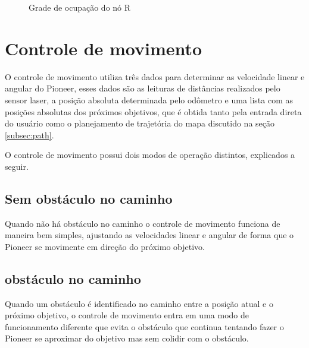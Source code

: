 \documentclass{llncs}
\begin{document}
\begin{figure}
	\centering
	\caption{Grade de ocupação do nó R}
	\label{fig:grade_no_R}
\end{figure}

\pagebreak
\section{Controle de movimento} \label{sec:movement}
O controle de movimento utiliza três dados para determinar as velocidade linear e angular do Pioneer, esses dados são as leituras de distâncias realizados pelo sensor laser, a posição absoluta determinada pelo odômetro e uma lista com as posições absolutas dos próximos objetivos, que é obtida tanto pela entrada direta do usuário como o planejamento de trajetória do mapa discutido na seção \ref{subsec:path}.

O controle de movimento possui dois modos de operação distintos, explicados a seguir.

\subsection{Sem obstáculo no caminho} \label{subscs:no_object}
Quando não há obstáculo no caminho o controle de movimento funciona de maneira bem simples, ajustando as velocidades linear e angular de forma que o Pioneer se movimente em direção do próximo objetivo.

\subsection{obstáculo no caminho} \label{subsec:object}
Quando um obstáculo é identificado no caminho entre a posição atual e o próximo objetivo, o controle de movimento entra em uma modo de funcionamento diferente que evita o obstáculo que continua tentando fazer o Pioneer se aproximar do objetivo mas sem colidir com o obstáculo.
\end{document}
